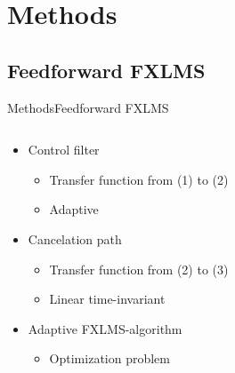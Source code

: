 \section{Methods}

\subsection{Feedforward FXLMS}
\begin{frame}{Methods}{Feedforward FXLMS}
		\begin{columns}
			\begin{column}{0.5\textwidth}
			\begin{itemize}
				\item Control filter
				\begin{itemize}
					\item Transfer function from (1) to (2)
					\item Adaptive
				\end{itemize}
				\item Cancelation path
				\begin{itemize}
					\item Transfer function from (2) to (3)
					\item Linear time-invariant 
				\end{itemize}
				\item Adaptive FXLMS-algorithm
				\begin{itemize}
					\item Optimization problem
				\end{itemize}
			\end{itemize}
			\end{column}
			\begin{column}{0.5\textwidth} 
			\resizebox{1.1\columnwidth}{!}{		
			}
			\end{column}
		\end{columns}

\end{frame}


